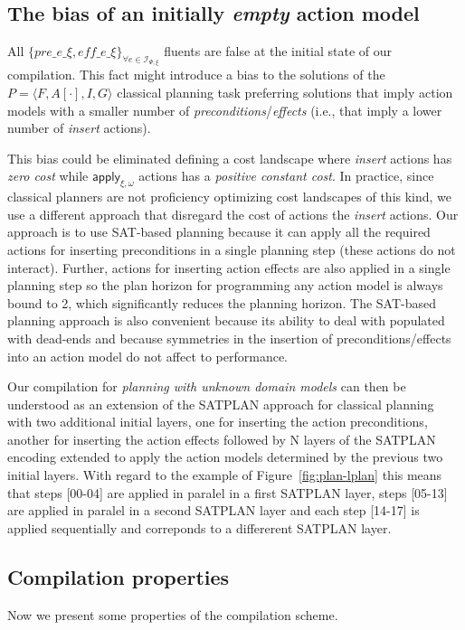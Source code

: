 \documentclass{article}
\newcommand{\tup}[1]{{\langle #1 \rangle}}
\begin{document}
\subsection{The bias of an initially {\em empty} action model}
All $\{pre\_e\_\xi, eff\_e\_\xi\}_{\forall e\in{\mathcal I}_{\Psi,\xi}}$ fluents are false at the initial state of our compilation. This fact might introduce a bias to the solutions of the $P=\tup{F,A[\cdot],I,G}$ classical planning task preferring solutions that imply action models with a smaller number of {\em preconditions}/{\em effects} (i.e., that imply a lower number of {\em insert} actions).

This bias could be eliminated defining a cost landscape where {\em insert} actions has {\em zero cost} while $\mathsf{apply_{\xi,\omega}}$ actions has a {\em positive constant cost}. In practice, since classical planners are not proficiency optimizing cost landscapes of this kind, we use a different approach that disregard the cost of actions the {\em insert} actions. Our approach is to use SAT-based planning because it can apply all the required actions for inserting preconditions in a single planning step (these actions do not interact). Further, actions for inserting action effects are also applied in a single planning step so the plan horizon for programming any action model is always bound to 2, which significantly reduces the planning horizon. The SAT-based planning approach is also convenient because its ability to deal with populated with dead-ends and because symmetries in the insertion of preconditions/effects into an action model do not affect to performance.

Our compilation for {\em planning with unknown domain models} can then be understood as an extension of the SATPLAN approach for classical planning~\cite{kautz1992planning} with two additional initial layers, one for inserting the action preconditions, another for inserting the action effects followed by N layers of the SATPLAN encoding extended to apply the action models determined by the previous two initial layers. With regard to the example of Figure~\ref{fig:plan-lplan} this means that steps [00-04] are applied in paralel in a first SATPLAN layer, steps [05-13] are applied in paralel in a second SATPLAN layer and each step [14-17] is applied sequentially and correponds to a differerent SATPLAN layer.

\subsection{Compilation properties}
Now we present some properties of the compilation scheme.
\end{document}
